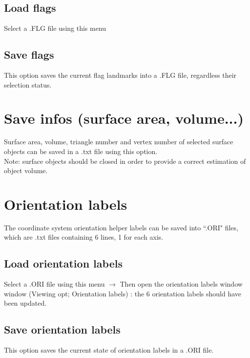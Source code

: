 \subsection{Load flags}
Select a .FLG file using this menu

\subsection{Save flags}
This option saves the current flag landmarks into a .FLG file, regardless their selection status.

\section{Save infos (surface area, volume...)}
Surface area, volume, triangle number and
vertex number of selected surface objects can be
saved in a .txt file using this option.\\

Note: surface objects should be closed in order to provide a correct estimation of object volume.
\section{Orientation labels}
The coordinate system orientation helper labels can be saved into ``.ORI" files, which are .txt files
containing 6 lines, 1 for each axis.


\subsection{Load orientation labels}
Select a .ORI file using this menu $\rightarrow$ Then open the orientation labels window window (Viewing opt;
Orientation labels) : the 6 orientation labels should have been updated.

\subsection{Save orientation labels}
This option saves the current state of orientation labels in a .ORI file.


